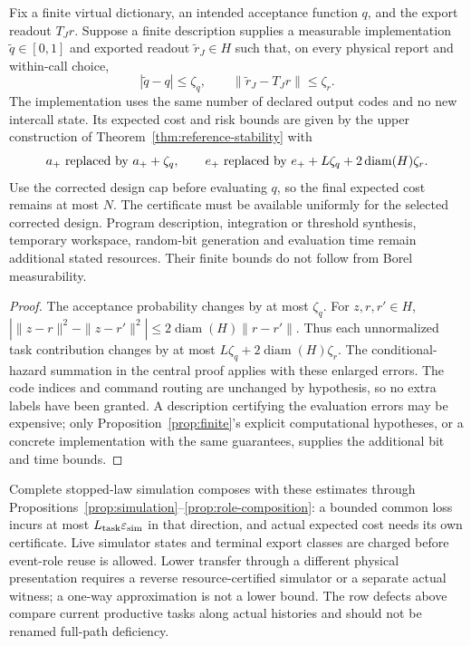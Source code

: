 \begin{proposition}\label{prop:calibrated-numerics}
Fix a finite virtual dictionary, an intended acceptance function $q$, and the export readout $T_Jr$. Suppose a finite description supplies a measurable implementation $\widetilde q\in[0,1]$ and exported readout $\widetilde r_J\in H$ such that, on every physical report and within-call choice,
\[
 |\widetilde q-q|\le\zeta_q,\qquad
 \|\widetilde r_J-T_Jr\|\le\zeta_r.
\]
The implementation uses the same number of declared output codes and no new intercall state. Its expected cost and risk bounds are given by the upper construction of Theorem~\ref{thm:reference-stability} with
\[
 a_+\ \hbox{replaced by }a_++\zeta_q,\qquad
 e_+\ \hbox{replaced by }e_++L\zeta_q+2\operatorname{diam}(H)\zeta_r.
\]
Use the corrected design cap before evaluating $q$, so the final expected cost remains at most $N$. The certificate must be available uniformly for the selected corrected design. Program description, integration or threshold synthesis, temporary workspace, random-bit generation and evaluation time remain additional stated resources. Their finite bounds do not follow from Borel measurability.
\end{proposition}
\begin{proof}
The acceptance probability changes by at most $\zeta_q$. For $z,r,r'\in H$,
$|\|z-r\|^2-\|z-r'\|^2|\le2\operatorname{diam}(H)\|r-r'\|$.
Thus each unnormalized task contribution changes by at most $L\zeta_q+2\operatorname{diam}(H)\zeta_r$. The conditional-hazard summation in the central proof applies with these enlarged errors. The code indices and command routing are unchanged by hypothesis, so no extra labels have been granted. A description certifying the evaluation errors may be expensive; only Proposition~\ref{prop:finite}'s explicit computational hypotheses, or a concrete implementation with the same guarantees, supplies the additional bit and time bounds.
\end{proof}

Complete stopped-law simulation composes with these estimates through Propositions~\ref{prop:simulation}--\ref{prop:role-composition}: a bounded common loss incurs at most $L_{\rm task}\varepsilon_{\rm sim}$ in that direction, and actual expected cost needs its own certificate. Live simulator states and terminal export classes are charged before event-role reuse is allowed. Lower transfer through a different physical presentation requires a reverse resource-certified simulator or a separate actual witness; a one-way approximation is not a lower bound. The row defects above compare current productive tasks along actual histories and should not be renamed full-path deficiency.
